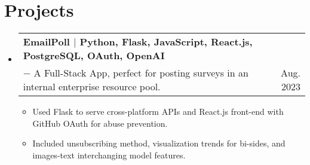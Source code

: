 \documentclass[letterpaper,10pt]{article}
\makeatletter
\newcommand{\skill}[1]{\small{\textnormal{$|$ {#1}}}}
\newcommand{\resumeItem}[1]{
  \item\small{
    {#1 \vspace{-2pt}}
  }
}
\newcommand{\resumeProjectHeading}[3]{
    \item
    \begin{tabular*}{0.97\textwidth}{l@{\extracolsep{\fill}}r}
      \textbf{#1} \\
      \small#2 & \small #3 \\
    \end{tabular*}\vspace{-7pt}
}
\newcommand{\resumeSubHeadingListStart}{\begin{itemize}[leftmargin=0.15in, label={}]}
\newcommand{\resumeSubHeadingListEnd}{\end{itemize}}
\newcommand{\resumeItemListStart}{\begin{itemize}}
\newcommand{\resumeItemListEnd}{\end{itemize}\vspace{-5pt}}
\makeatother
\begin{document}
\section{Projects}
\resumeSubHeadingListStart
\resumeProjectHeading
{\textbf{EmailPoll} \skill{Python, Flask, JavaScript, React.js, PostgreSQL, OAuth, OpenAI}}
{$-$ A Full-Stack App, perfect for posting surveys in an internal enterprise resource pool.}
{Aug. 2023}
\resumeItemListStart
\resumeItem{Used Flask to serve cross-platform APIs and React.js front-end with GitHub OAuth for abuse prevention.}
\resumeItem{Included unsubscribing method, visualization trends for bi-sides, and images-text interchanging model features.}
\resumeItemListEnd
\resumeSubHeadingListEnd
\end{document}
